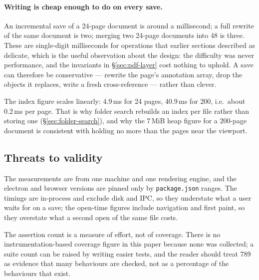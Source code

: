 \paragraph{Writing is cheap enough to do on every save.} An incremental save of a 24-page
document is around a millisecond; a full rewrite of the same document is two; merging two
24-page documents into 48 is three. These are single-digit milliseconds for operations that
earlier sections described as delicate, which is the useful observation about the design: the
difficulty was never performance, and the invariants in \S\ref{sec:pdf-layer} cost nothing to
uphold. A save can therefore be conservative --- rewrite the page's annotation array, drop the
objects it replaces, write a fresh cross-reference --- rather than clever.

The index figure scales linearly: 4.9\,ms for 24 pages, 40.9\,ms for 200, i.e.\ about
0.2\,ms per page. That is why folder search rebuilds an index per file rather than storing one
(\S\ref{sec:folder-search}), and why the 7\,MiB heap figure for a 200-page document is
consistent with holding no more than the pages near the viewport.

\subsection{Threats to validity}

The measurements are from one machine and one rendering engine, and the electron and browser
versions are pinned only by \texttt{package.json} ranges. The timings are in-process and exclude
disk and IPC, so they understate what a user waits for on a save; the open-time figures include
navigation and first paint, so they overstate what a second open of the same file costs.

The assertion count is a measure of effort, not of coverage. There is no instrumentation-based
coverage figure in this paper because none was collected; a suite count can be raised by
writing easier tests, and the reader should treat 789 as evidence that many behaviours are
checked, not as a percentage of the behaviours that exist.
